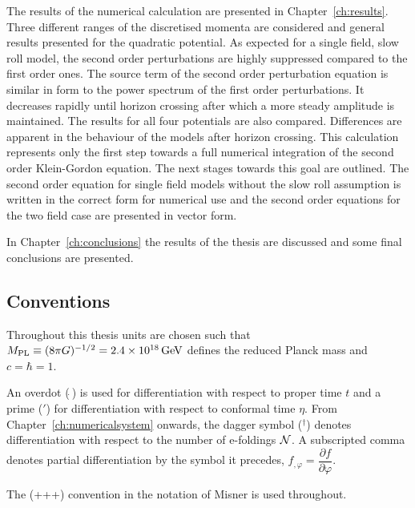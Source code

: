 The results of the numerical calculation are presented in Chapter~\ref{ch:results}.
Three different ranges of the discretised momenta are considered and general
results presented for the quadratic potential. 
As expected for a single field, slow
roll model, the second order perturbations are highly suppressed compared to the
first order ones. 
The source term of the second order perturbation equation is similar in form to the
power spectrum of the first order perturbations. It decreases rapidly until
horizon
crossing after which a more steady amplitude is maintained.
% 
% 
The results for all four potentials are also compared. Differences are apparent in
the behaviour of the models after horizon crossing.
This calculation represents only the first step towards a full numerical integration
of the second order Klein-Gordon equation. The next stages towards this goal are
outlined. The second order equation for single field models without the slow roll
assumption is written in the correct form for numerical use and the second order
equations for the two field case are presented in vector form.
% 

In Chapter~\ref{ch:conclusions} the results of the thesis are discussed and some
final conclusions are presented.








\subsection*{Conventions}
\label{sec:conventions}
Throughout this thesis units are chosen such that $M_{\mathrm{PL}} \equiv (8\pi G )^{-1/2}=
2.4 \times 10^{18}\, {\rm GeV}$ defines the reduced Planck mass and $c=\hbar =1$. 

An overdot ($\dot{~}$) is used for differentiation with respect to proper
time $t$ and a prime ($'$) for differentiation with respect to conformal time
$\eta$. From Chapter~\ref{ch:numericalsystem} onwards,  the dagger symbol
($^\dagger$) denotes differentiation with respect to the
number of e-foldings $\mathcal{N}$.
% 
A subscripted comma denotes partial differentiation by the symbol it
precedes, \eg $f_{,\varphi} = \dfrac{\partial f}{\partial \varphi}$.

The (+++) convention in the notation of Misner \etal \cite{book:kip} is
used throughout. 


